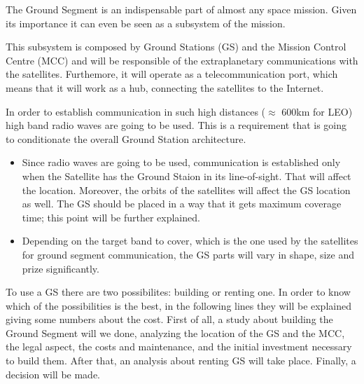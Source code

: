 The Ground Segment is an indispensable part of almost any space mission. Given its importance it can even be seen as a subsystem of the mission.

This subsystem is composed by Ground Stations (GS) and the Mission Control Centre (MCC) and will be responsible of the extraplanetary communications with the satellites. Furthemore, it will operate as a telecommunication port, which means that it will work as a hub, connecting the satellites to the Internet.

In order to establish communication in such high distances ($\approx$ 600km for LEO) high band radio waves are going to be used. This is a requirement that is going to conditionate the overall Ground Station architecture.
\begin{itemize}
\item Since radio waves are going to be used, communication is established only when the Satellite has the Ground Staion in its line-of-sight. That will affect the location. Moreover, the orbits of the satellites will affect the GS location as well. The GS should be placed in a way that it gets maximum coverage time; this point will be further explained.
\item Depending on the target band to cover, which is the one used by the satellites for ground segment communication, the GS parts will vary in shape, size and prize significantly.
\end{itemize}

To use a GS there are two possibilites: building or renting one. In order to know which of the possibilities is the best, in the following lines they will be explained giving some numbers about the cost. First of all, a study about building the Ground Segment will we done, analyzing the location of the GS and the MCC, the legal aspect, the costs and maintenance, and the initial investment necessary to build them. After that, an analysis about renting GS will take place. Finally, a decision will be made.